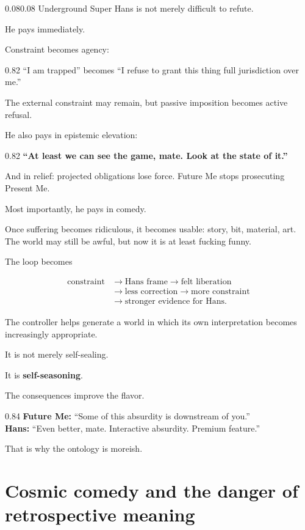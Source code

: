 \documentclass[10pt,letterpaper]{article}
\newenvironment{paperbody}
  {\begin{adjustwidth}{0.08\textwidth}{0.08\textwidth}\justifying}
  {\par\end{adjustwidth}}
\newenvironment{voicebox}
  {\Needspace{3.5\baselineskip}\par\vspace{0.22em}\begin{center}\begingroup
   \begin{lrbox}{\voiceboxsave}\begin{varwidth}{0.82\linewidth}
   \small\rmfamily\upshape\RaggedRight}
  {\end{varwidth}\end{lrbox}\fbox{\usebox{\voiceboxsave}}
   \endgroup\end{center}\vspace{0.22em}}
\newenvironment{dialoguebox}
  {\Needspace{5\baselineskip}\par\vspace{0.26em}\begin{center}\begingroup
   \begin{lrbox}{\dialogueboxsave}\begin{varwidth}{0.84\linewidth}
   \small\rmfamily\upshape\RaggedRight}
  {\end{varwidth}\end{lrbox}\fbox{\usebox{\dialogueboxsave}}
   \endgroup\end{center}\vspace{0.26em}}
\let\oldsection\section
\renewcommand{\section}{\Needspace{6\baselineskip}\oldsection}
\begin{document}
\begin{paperbody}
Underground Super Hans is not merely difficult to refute.

He pays immediately.

Constraint becomes agency:

\begin{voicebox}
``I am trapped'' becomes ``I refuse to grant this thing full
jurisdiction over me.''
\end{voicebox}

The external constraint may remain, but passive imposition becomes
active refusal.

He also pays in epistemic elevation:

\begin{voicebox}
\textbf{``At least we can see the game, mate. Look at the state of
it.''}
\end{voicebox}

And in relief: projected obligations lose force. Future Me stops
prosecuting Present Me.

Most importantly, he pays in comedy.

Once suffering becomes ridiculous, it becomes usable: story, bit,
material, art. The world may still be awful, but now it is at least
fucking funny.

The loop becomes

\[
\begin{aligned}
\text{constraint} &\to \text{Hans frame} \to \text{felt liberation} \\
&\to \text{less correction} \to \text{more constraint} \\
&\to \text{stronger evidence for Hans}.
\end{aligned}
\]

The controller helps generate a world in which its own interpretation
becomes increasingly appropriate.

It is not merely self-sealing.

It is \textbf{self-seasoning}.

The consequences improve the flavor.

\begin{dialoguebox}
\textbf{Future Me:} ``Some of this absurdity is downstream of you.''\\[0.35em]
\textbf{Hans:} ``Even better, mate. Interactive absurdity. Premium
feature.''
\end{dialoguebox}

That is why the ontology is moreish.

\section{Cosmic comedy and the danger of retrospective
meaning}\label{cosmic-comedy-and-the-danger-of-retrospective-meaning}


\end{paperbody}
\end{document}
